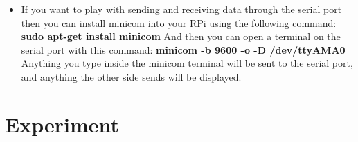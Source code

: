 \documentclass[11pt,a4paper]{article}
\begin{document}
\begin{itemize}
		\item If you want to play with sending and receiving data through the serial port then you can install minicom into your RPi using the following command:
		\newline \textbf{sudo apt-get install minicom}
		\newline And then you can open a terminal on the serial port with this command:
		\newline \textbf{minicom -b 9600 -o -D /dev/ttyAMA0}
		\newline Anything you type inside the minicom terminal will be sent to the serial port, and anything the other side sends will be displayed.
	\end{itemize}
	\flushleft
	\section{Experiment}
\end{document}
